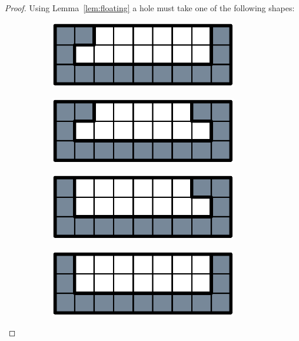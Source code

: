 \begin{proof}
Using Lemma~\ref{lem:floating} a hole must take one of the following shapes:

\begin{figure}[ht]
  \centering
  \begin{subfigure}[b]{0.24\textwidth}
    \centering
    \includegraphics[width=0.9\textwidth]{pictures/dominoes/simple-hole-1.pdf}
    \caption{}
    \label{dom:hole-a}
  \end{subfigure}
  \begin{subfigure}[b]{0.24\textwidth}
    \centering
    \includegraphics[width=0.9\textwidth]{pictures/dominoes/simple-hole-2.pdf}
    \caption{}
    \label{dom:hole-b}
  \end{subfigure}
  \begin{subfigure}[b]{0.24\textwidth}
    \centering
    \includegraphics[width=0.9\textwidth]{pictures/dominoes/simple-hole-3.pdf}
    \caption{}
    \label{dom:hole-c}
  \end{subfigure}
  \begin{subfigure}[b]{0.24\textwidth}
    \centering
    \includegraphics[width=0.9\textwidth]{pictures/dominoes/simple-hole-4.pdf}
    \caption{}
    \label{dom:hole-d}
  \end{subfigure}
  \label{dom:holes}
\end{figure}


\end{proof}
